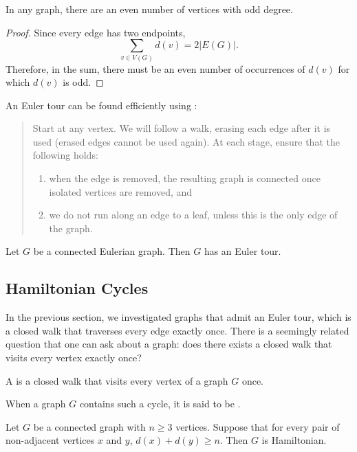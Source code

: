 \begin{lemma}
In any graph, there are an even number of vertices with odd degree.
\end{lemma}

\begin{proof}
Since every edge has two endpoints,
\[\sum_{v\in V(G)}d(v)=2|E(G)|.\]
Therefore, in the sum, there must be an even number of occurrences of $d(v)$ for which $d(v)$ is odd.
\end{proof}

An Euler tour can be found efficiently using :
\begin{quote}
Start at any vertex. We will follow a walk, erasing each edge after it is used (erased edges cannot be used again). At each stage, ensure that the following holds:
\begin{enumerate}[label=(\roman*)]
\item when the edge is removed, the resulting graph is connected once isolated vertices are removed, and
\item we do not run along an edge to a leaf, unless this is the only edge of the graph.
\end{enumerate}
\end{quote}

\begin{theorem}[Euler]
Let $G$ be a connected Eulerian graph. Then $G$ has an Euler tour.
\end{theorem}

\subsection{Hamiltonian Cycles}
In the previous section, we investigated graphs that admit an Euler tour, which is a closed walk that traverses every edge exactly once. There is a seemingly related question that one can ask about a graph: does there exists a closed walk that visits every vertex exactly once?

\begin{definition}
A  is a closed walk that visits every vertex of a graph $G$ once.

When a graph $G$ contains such a cycle, it is said to be .
\end{definition}

\begin{theorem}
Let $G$ be a connected graph with $n\ge3$ vertices. Suppose that for every pair of non-adjacent vertices $x$ and $y$, $d(x)+d(y)\ge n$. Then $G$ is Hamiltonian.
\end{theorem}

